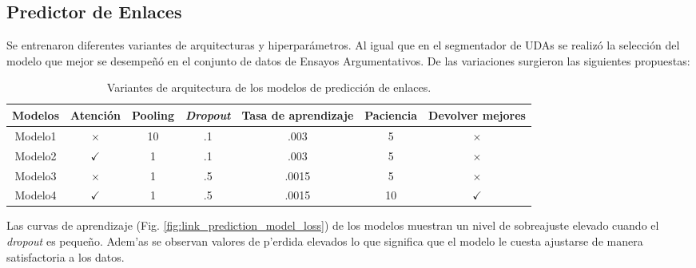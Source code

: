\subsection{Predictor de Enlaces}

Se entrenaron diferentes variantes de arquitecturas y hiperparámetros. Al igual que en el segmentador de
UDAs se realizó la selección del modelo que mejor se desempeñó en el conjunto de datos de Ensayos Argumentativos.
De las variaciones surgieron las siguientes propuestas:

\begin{table}[h!]
	\begin{center}
		\begin{tabular}{|c|c|c|c|c|c|c|} \hline
		Modelos  & Atención      & Pooling  & \emph{Dropout}   & Tasa de aprendizaje & Paciencia & Devolver mejores     \\ \hline
		Modelo1	 & $\times$	     & 10       & .1               & .003                & 5	      & $\times$            \\ \hline
		Modelo2	 & $\checkmark$	 &  1       & .1               & .003                & 5	      & $\times$            \\ \hline
		Modelo3	 & $\times$	     &  1       & .5               & .0015               & 5	      & $\times$            \\ \hline
		Modelo4	 & $\checkmark$	 &  1       & .5               & .0015               & 10	      & $\checkmark$        \\ \hline
		\end{tabular}
	\caption{Variantes de arquitectura de los modelos de predicción de enlaces.}\label{table:link_predictor_architecture_table}
	\end{center}
\end{table}

Las curvas de aprendizaje (Fig. \ref{fig:link_prediction_model_loss}) de los modelos muestran un nivel de sobreajuste 
elevado cuando el \emph{dropout} es pequeño. Adem'as se observan valores de p'erdida elevados lo que significa 
que el modelo le cuesta ajustarse de manera satisfactoria a los datos.

